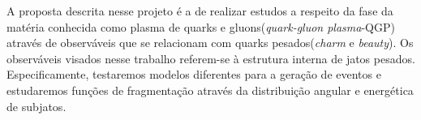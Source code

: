 A proposta descrita nesse projeto é a de realizar estudos a respeito da fase da matéria conhecida
como plasma de quarks e gluons(\emph{quark-gluon plasma}-QGP) através de observáveis que se relacionam
com quarks pesados(\emph{charm} e \emph{beauty}). Os observáveis visados nesse trabalho referem-se
à estrutura interna de jatos pesados. Especificamente, testaremos modelos diferentes para a geração
de eventos e estudaremos funções de fragmentação através da distribuição angular e energética de subjatos.